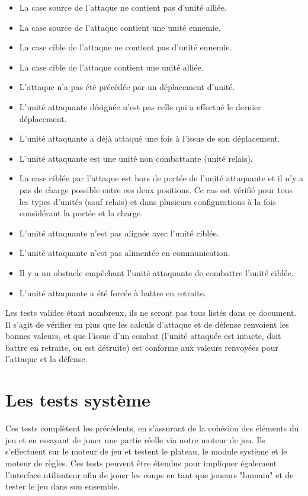 \documentclass[a4paper]{report}
\begin{document}
\begin{itemize}
\item La case source de l'attaque ne contient pas d'unité alliée.
\item La case source de l'attaque contient une unité ennemie.
\item La case cible de l'attaque ne contient pas d'unité ennemie.
\item La case cible de l'attaque contient une unité alliée.
\item L'attaque n'a pas été précédée par un déplacement d'unité.
\item L'unité attaquante désignée n'est pas celle qui a effectué le dernier déplacement.
\item L'unité attaquante a déjà attaqué une fois à l'issue de son déplacement.
\item L'unité attaquante est une unité non combattante (unité relais).
\item La case ciblée par l'attaque est hors de portée de l'unité attaquante et il n'y a pas de charge possible entre ces deux positions. Ce cas est vérifié pour tous les types d'unités (sauf relais) et dans plusieurs configurations à la fois considérant la portée et la charge.
\item L'unité attaquante n'est pas alignée avec l'unité ciblée.
\item L'unité attaquante n'est pas alimentée en communication.
\item Il y a un obstacle empêchant l'unité attaquante de combattre l'unité ciblée.
\item L'unité attaquante a été forcée à battre en retraite.
\end{itemize}

Les tests valides étant nombreux, ils ne seront pas tous listés dans ce document. Il s'agit de vérifier en plus que les calculs d'attaque et de défense renvoient les bonnes valeurs, et que l'issue d'un combat (l'unité attaquée est intacte, doit battre en retraite, ou est détruite) est conforme aux valeurs renvoyées pour l'attaque et la défense.

\section{Les tests système}
Ces tests complètent les précédents, en s'assurant de la cohésion des éléments du jeu et en essayant de jouer une partie réelle via notre moteur de jeu. Ils s'effectuent sur le moteur de jeu et testent le plateau, le module système et le moteur de règles. Ces tests peuvent être étendus pour impliquer également l'interface utilisateur afin de jouer les coups en tant que joueurs "humain" et de tester le jeu dans son ensemble.
\end{document}
